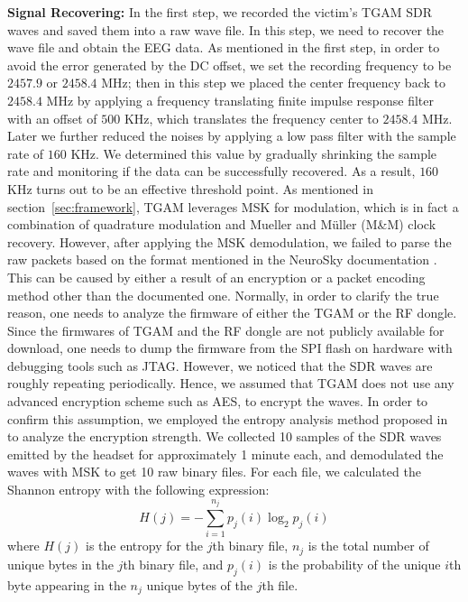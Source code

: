 %
\indent \textbf{Signal Recovering:} In the first step, we recorded the victim's TGAM SDR waves and saved them into a raw wave file. In this step, we need to recover the wave file and obtain the EEG data. As mentioned in the first step, in order to avoid the error generated by the DC offset, we set the recording frequency to be $2457.9$ or $2458.4$ MHz; then in this step we placed the center frequency back to $2458.4$ MHz by applying a frequency translating finite impulse response filter with an offset of $500$ KHz, which translates the frequency center to $2458.4$ MHz. Later we further reduced the noises by applying a low pass filter with the sample rate of $160$ KHz.  We determined this value by gradually shrinking the sample rate and monitoring if the data can be successfully recovered. As a result, $160$ KHz turns out to be an effective threshold point. As mentioned in section~\ref{sec:framework}, TGAM leverages MSK for modulation, which is in fact a combination of quadrature modulation and Mueller and M\"{u}ller (M\&M) clock recovery. However, after applying the MSK demodulation, we failed to parse the raw packets based on the format mentioned in the NeuroSky documentation \cite{tgsprawpacket}. This can be caused by either a result of an encryption or a packet encoding method other than the documented one. Normally, in order to clarify the true reason, one needs to analyze the firmware of either the TGAM or the RF dongle. Since the firmwares of TGAM and the RF dongle are not publicly available for download, one needs to dump the firmware from the SPI flash on hardware with debugging tools such as JTAG. However, we noticed that the SDR waves are roughly repeating periodically. Hence, we assumed that TGAM does not use any advanced encryption scheme such as AES, to encrypt the waves. In order to confirm this assumption, we employed the entropy analysis method proposed in \cite{lyda2007using} to analyze the encryption strength. We collected 10 samples of the SDR waves emitted by the headset for approximately 1 minute each, and demodulated the waves with MSK to get 10 raw binary files. For each file, we calculated the Shannon entropy with the following expression:
\begin{equation}
H(j)=-\sum_{i=1}^{n_j} p_j(i)\log_{2}p_j(i)
\end{equation}
where $H(j)$ is the entropy for the $j$th binary file, $n_j$ is the total number of unique bytes in the $j$th binary file, and $p_j(i)$ is the probability of the unique $i$th byte appearing in the $n_j$ unique bytes of the $j$th file.\\
